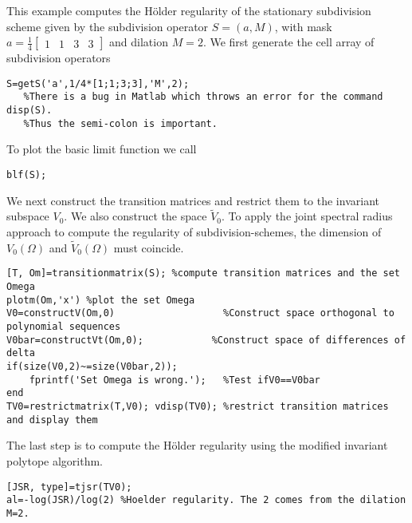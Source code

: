 \begin{example}\label{ex_subdivision}
This example computes the Hölder regularity of the stationary subdivision scheme given by the subdivision operator 
$S=(a,M)$, 
with mask $a=\frac{1}{4}\left[\begin{array}{cccc}1 & 1& 3&3\end{array}\right]$ 
and dilation $M=2$.
We first generate the cell array of subdivision operators
\begin{verbatim}
S=getS('a',1/4*[1;1;3;3],'M',2);
   %There is a bug in Matlab which throws an error for the command disp(S). 
   %Thus the semi-colon is important.
\end{verbatim}
To plot the basic limit function we call
\begin{verbatim}
blf(S);
\end{verbatim}
We next construct the transition matrices and restrict them to the invariant subspace $V_0$. 
We also construct the space $\tilde{V}_0$. To apply the joint spectral radius approach to compute the regularity of subdivision-schemes, the dimension of $V_0(\Omega)$ and $\tilde{V}_0(\Omega)$ must coincide.
\begin{verbatim}
[T, Om]=transitionmatrix(S); %compute transition matrices and the set Omega
plotm(Om,'x') %plot the set Omega
V0=constructV(Om,0)                   %Construct space orthogonal to polynomial sequences
V0bar=constructVt(Om,0);            %Construct space of differences of delta
if(size(V0,2)~=size(V0bar,2)); 
    fprintf('Set Omega is wrong.');   %Test ifV0==V0bar
end
TV0=restrictmatrix(T,V0); vdisp(TV0); %restrict transition matrices and display them
\end{verbatim}
The last step is to compute the Hölder regularity using the modified invariant polytope algorithm.
\begin{verbatim}
[JSR, type]=tjsr(TV0);  
al=-log(JSR)/log(2) %Hoelder regularity. The 2 comes from the dilation M=2.
\end{verbatim}

\end{example}

